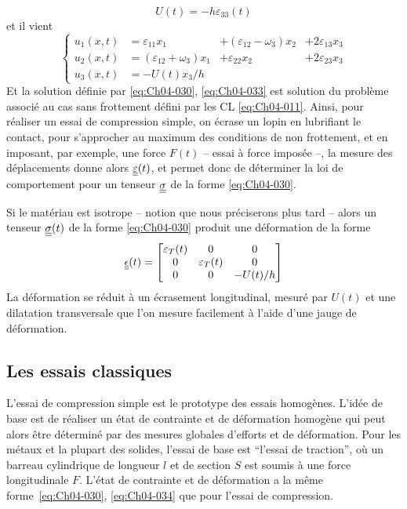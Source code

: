 \begin{equation}
    U(t) = -h \varepsilon_{33}(t)
    \label{eq:Ch04-032}
\end{equation}
et il vient
\begin{equation}
    \left\{
    \begin{aligned}
        u_1(x,t) &= \varepsilon_{11}x_1 &+ (\varepsilon_{12} - \omega_3) x_2 &+ 2\varepsilon_{13}x_3 \\
        u_2(x,t) &= (\varepsilon_{12} + \omega_3) x_1 &+ \varepsilon_{22}x_2 &+ 2\varepsilon_{23}x_3 \\
        u_3(x,t) &= -U(t) x_3/h
    \end{aligned}
    \right.
    \label{eq:Ch04-033}
\end{equation}
Et la solution définie par \eqref{eq:Ch04-030}, \eqref{eq:Ch04-033} est solution du problème associé au cas sans frottement défini par les CL \eqref{eq:Ch04-011}.
Ainsi, pour réaliser un essai de compression simple, on écrase un lopin en lubrifiant le contact, pour s'approcher au maximum des conditions de non frottement, et en imposant, par exemple, une force $F(t)$ -- essai à force imposée --, la mesure des déplacements donne alors $\underline{\underline{\varepsilon}}(t)$, et permet donc de déterminer la loi de comportement pour un tenseur $\underline{\underline{\sigma}}$ de la forme \eqref{eq:Ch04-030}.

Si le matériau est isotrope -- notion que nous préciserons plus tard -- alors un tenseur $\underline{\underline{\sigma}}(t)$ de la forme \eqref{eq:Ch04-030} produit une déformation de la forme
\begin{equation}
    \underline{\underline{\epsilon}} (t) = 
    \begin{bmatrix}
        \varepsilon_T(t) & 0 & 0 \\
        0 & \varepsilon_T (t) & 0 \\
        0 & 0 & -U(t)/h
    \end{bmatrix}
    \label{eq:Ch04-034}
\end{equation}
La déformation se réduit à un écrasement longitudinal, mesuré par $U(t)$ et une dilatation transversale que l'on mesure facilement à l'aide d'une jauge de déformation.

\subsection{Les essais 	classiques}
L'essai de compression simple est le prototype des essais homogènes.
L'idée de base est de réaliser un état de contrainte et de déformation homogène qui peut alors être déterminé par des mesures globales d'efforts et de déformation.
Pour les métaux et la plupart des solides, l'essai de base est ``l'essai de traction'', où un barreau cylindrique de longueur $l$ et de section $S$ est soumis à une force longitudinale $F$.
L'état de contrainte et de déformation a la même forme~\eqref{eq:Ch04-030}, \eqref{eq:Ch04-034} que pour l'essai de compression.

